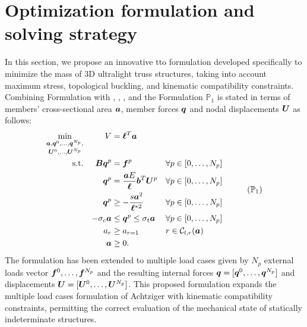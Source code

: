 \section{Optimization formulation and solving strategy}
\label{sec:method}
In this section, we propose an innovative \gls{tto} formulation developed specifically to minimize the mass of 3D ultralight truss structures, taking into account maximum stress, topological buckling, and kinematic compatibility constraints. Combining Formulation  with , , , and  the Formulation $\mathbb{P}_1$ is stated in terms of members' cross-sectional area $\bm{a}$, member forces $\bm{q}$ and nodal displacements $\bm{U}$ as follows:
\begin{equation}
    \begin{aligned}
    \underset{\vect{U}^0, \dots, \vect{U}^{N_p}}{\min_{\vect{a}, \vect{q}^0, \dots, \vect{q}^{N_p},}}   && V &= \vect{\ell}^{T}\vect{a}\\
    \textrm{s.t.}   && \matr{B}\vect{q}^p &= \vect{f}^p && \forall p \in [0,\dots,N_p]\\
    && \vect{q}^p &= \frac{\vect{a}E}{\vect{\ell}}\vect{b}^T\vect{U}^p && \forall p \in [0,\dots,N_p] \\
    && \vect{q}^p &\geq -\frac{s\vect{a}^2}{\vect{\ell}^{*2}} && \forall p \in [0,\dots,N_p] \\
    && -\sigma_c\vect{a} &\leq \vect{q}^p \leq \sigma_t\vect{a} && \forall p \in [0,\dots,N_p] \\
    && a_{r}&\geq a_{r=1} && r \in \mathcal{C}_{l,r}(\vect{a}) \\
    && \vect{a} &\geq 0. \\
    \end{aligned}
    \tag{$\mathbb{P}_1$}
    \label{eq:optim_complete}
\end{equation}
The formulation has been extended to multiple load cases given by $N_p$ external loads vector $\bm{f}^0, \dots, \bm{f}^{N_p}$ and the resulting internal forces $\bm{q} = [\bm{q}^0,\dots, \bm{q}^{N_p}]$ and displacements $\bm{U} = [\bm{U}^0,\dots, \bm{U}^{N_p}]$. This proposed formulation expands the multiple load cases formulation of Achtziger  with kinematic compatibility constraints, permitting the correct evaluation of the mechanical state of statically indeterminate structures.

